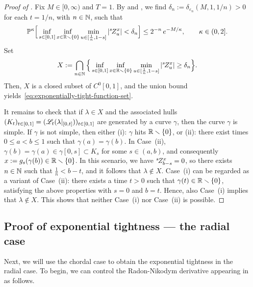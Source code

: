 \documentclass[a4paper, 11pt]{article}
\theoremstyle{definition}
\numberwithin{equation}{section}
\numberwithin{figure}{section}
\newcommand{\cLoewnerTransform}[1][]{\mathscr{L}_{\ifx&#1&\else#1\fi}}
\newcommand{\bessel}[1][]{{\ifx&#1&\else{^{#1 \!}}\fi}Z}
\newcommand{\funs}[2][]{C^{0}_{#1}[0,#2}
\newcommand{\BMmeasure}[2][]{\bP^{#2}_{\!#1}}
\begin{document}
\begin{proof}[Proof of ]
Fix $M \in [0,\infty)$ and $T = 1$. 
By  
 and , 
we find $\delta_n := \delta_{\varepsilon_n}(M,1,1/n) > 0$ for each $t = 1/n$, with $n \in \mathbb{N}$, such that  
\begin{align*}
\BMmeasure{\kappa}\Big[\inf_{s \in [0,1]} \inf_{x \in \bR \smallsetminus \{0\}} \min_{u \in [\frac{1}{n},1-s]} |\bessel[s]^x_u| < \delta_n \Big] 
\le 2^{-n} \, e^{-M/\kappa} , \qquad \kappa \in (0,2].
\end{align*}
Set 
\begin{align}\label{eqn:Xset}
X := \bigcap_{n \in \bN}
\Big\{\inf_{s \in [0,1]} \inf_{x \in \bR \smallsetminus \{0\}} \min_{u \in [\frac{1}{n},1-s]} |\bessel[s]^x_u| \geq \delta_n\Big\} .
\end{align}
Then, $X$ is a closed subset of $\funs{1]}$, and the union bound yields~\eqref{eq:exponentially-tight-function-set}. 


It remains to check that if $\lambda \in X$ and the associated hulls 
$(K_t)_{t \in [0,1]} = (\cLoewnerTransform[t](\lambda|_{[0,t]}))_{t \in [0,1]}$ are generated by a curve $\gamma$, then the curve $\gamma$ is simple. 
If $\gamma$ is not simple, then either (i): $\gamma$ hits $\mathbb{R}\smallsetminus\{0\}$, 
or (ii): there exist times $0 \leq a < b \leq 1$ such that $\gamma(a) = \gamma(b)$. 
In Case~(ii), $\gamma(b) = \gamma(a) \in \gamma[0,s] \subset K_s$ for some $s \in (a, b)$, 
and consequently $x := g_s(\gamma(b)) \in \mathbb{R}\smallsetminus\{0\}$. 
In this scenario, we have $\bessel[s]^x_{b-s} = 0$, 
so there exists $n \in \mathbb{N}$ such that $\frac{1}{n} < b-t$, 
and it follows that $\lambda \notin X$. 
Case~(i) can be regarded as a variant of Case~(ii): 
there exists a time $t > 0$ such that $\gamma(t) \in \mathbb{R}\smallsetminus\{0\}$, 
satisfying the above properties with $s = 0$ and $b = t$. 
Hence, also Case~(i) implies that $\lambda \notin X$. 
This shows that neither Case~(i) nor Case~(ii) is possible.
\end{proof}


\subsection{Proof of exponential tightness --- the radial case}
\label{subsec:exp_tight_radial}

Next, we will use the chordal case to obtain the exponential tightness in the radial case. 
To begin, we can control the Radon-Nikodym derivative appearing in  as follows. 
\end{document}
